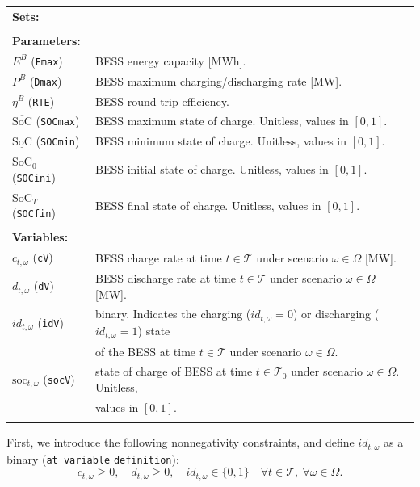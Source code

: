 \documentclass{article}
\newcommand{\SOC}{\text{SoC}}
\newcommand{\soc}{\text{soc}}
\begin{document}
\begin{tabularx}{\textwidth}{l l}
    \textbf{Sets:} \\
 	
    \\
    
    \textbf{Parameters:} \\
	$E^B$ (\verb|Emax|) & BESS energy capacity [MWh].	 \\
	$P^B$ (\verb|Dmax|) & BESS maximum charging/discharging rate [MW]. \\
	$\eta^B$ (\verb|RTE|) & BESS round-trip efficiency. \\
	$\overline{\SOC}$ (\verb|SOCmax|) & BESS maximum state of charge. Unitless, values in $[0, 1]$. \\
	$\underline{\SOC}$ (\verb|SOCmin|) & BESS minimum state of charge. Unitless, values in $[0, 1]$. \\
	$\SOC_0$ (\verb|SOCini|) & BESS initial state of charge. Unitless, values in $[0, 1]$. \\
	$\SOC_T$ (\verb|SOCfin|) & BESS final state of charge. Unitless, values in $[0, 1]$. \\
	\\
       
    \textbf{Variables:} \\
	$c_{t, \omega}$ (\verb|cV|)& BESS charge rate at time $t \in \mathcal{T}$ under scenario $\omega \in \Omega$ [MW]. \\
	$d_{t, \omega}$ (\verb|dV|)& BESS discharge rate at time $t \in \mathcal{T}$ under scenario $\omega \in \Omega$ [MW]. \\	
	$id_{t, \omega}$ (\verb|idV|) & binary. Indicates the charging ($id_{t, \omega} = 0$) or discharging ($id_{t, \omega}= 1$) state \\
	& of the BESS at time $t \in \mathcal{T}$ under scenario $\omega \in \Omega$. \\
	$\soc_{t, \omega}$ (\verb|socV|) & state of charge of BESS at time $t \in \mathcal{T}_0$ under scenario $\omega \in \Omega$. Unitless, \\
	& values in $[0, 1]$. \\
	\\
\end{tabularx}

First, we introduce the following nonnegativity  constraints, and define $id_{t, \omega}$ as a binary (\verb|at variable| \verb|definition|):
\begin{equation} \label{dVdCPos}
	c_{t, \omega} \geq 0, \quad d_{t, \omega} \geq 0, \quad id_{t, \omega} \in \{ 0, 1 \} \quad \forall t \in \mathcal{T}, \ \forall \omega \in \Omega.
\end{equation}
\end{document}
